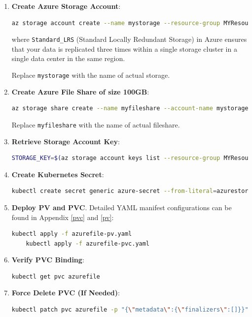 \documentclass{article}
\begin{document}
\begin{enumerate}
    \item \textbf{Create Azure Storage Account}:
    \begin{lstlisting}[language=bash]
    az storage account create --name mystorage --resource-group MYResourceGroup --location francecentral --sku Standard_LRS
    \end{lstlisting}

where \texttt{Standard\_LRS} (Standard Locally Redundant Storage) in Azure ensures that your data is replicated three times within a single storage cluster in a single data center in the same region.   
    
Replace \texttt{mystorage} with the name of actual storage.  
  
    \item \textbf{Create Azure File Share of size 100GB}:
    \begin{lstlisting}[language=bash]
    az storage share create --name myfileshare --account-name mystorage --quota 100
    \end{lstlisting}
  Replace \texttt{myfileshare} with the name of actual fileshare.  
    \item \textbf{Retrieve Storage Account Key}:
    \begin{lstlisting}[language=bash]
    STORAGE_KEY=$(az storage account keys list --resource-group MYResourceGroup --account-name mystorage --query "[0].value" -o tsv)
    \end{lstlisting}
    
    \item \textbf{Create Kubernetes Secret}:
    \begin{lstlisting}[language=bash]
    kubectl create secret generic azure-secret --from-literal=azurestorageaccountname=mystorage --from-literal=azurestorageaccountkey=$STORAGE_KEY
    \end{lstlisting}
    
    \item \textbf{Deploy PV and PVC}. Detailed YAML manifest configurations can be found in Appendix \ref{pvc} and \ref{pv}:
    \begin{lstlisting}[language=bash]
    kubectl apply -f azurefile-pv.yaml
    kubectl apply -f azurefile-pvc.yaml
    \end{lstlisting}
    
    \item \textbf{Verify PVC Binding}:
    \begin{lstlisting}[language=bash]
    kubectl get pvc azurefile
    \end{lstlisting}
    
    \item \textbf{Force Delete PVC (If Needed)}:
    \begin{lstlisting}[language=bash]
    kubectl patch pvc azurefile -p "{\"metadata\":{\"finalizers\":[]}}"
    \end{lstlisting}
\end{enumerate}
\end{document}
